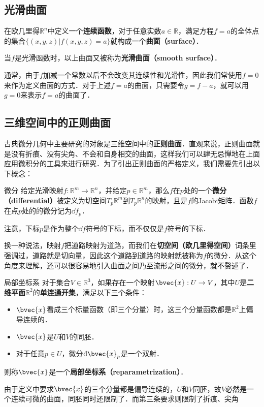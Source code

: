 
\subsection{光滑曲面}

在欧几里得$\mathbb{R}^n$中定义一个\textbf{连续函数}，对于任意实数$a\in\mathbb{R}$，满足方程$f=a$的全体点的集合$\{(x, y, z)|f(x, y, z)=a\}$就构成一个\textbf{曲面（surface）}．

当$f$是光滑函数时，以上曲面又被称为\textbf{光滑曲面（smooth surface）}．

通常，由于$f$加减一个常数以后不会改变其连续性和光滑性，因此我们常使用$f=0$来作为定义曲面的方式．对于上述$f=a$的曲面，只需要令$g=f-a$，就可以用$g=0$来表示$f=a$的曲面了．

\subsection{三维空间中的正则曲面}

古典微分几何中主要研究的对象是三维空间中的\textbf{正则曲面}．直观来说，正则曲面就是没有折痕、没有尖角、不会和自身相交的曲面，这样我们可以肆无忌惮地在上面应用微积分的工具来进行研究．为了引出正则曲面的严格定义，我们需要先引出以下概念：

\begin{definition}{微分}
给定光滑映射$f:\mathbb{R}^m\to\mathbb{R}^n$，并给定$p\in\mathbb{R}^m$，那么$f$在$p$处的一个\textbf{微分（differential）}被定义为切空间$T_p\mathbb{R}^m$到$T_p\mathbb{R}^n$的映射，且是$f$的Jacobi矩阵．函数$f$在点$p$处的的微分记为$\dd f_p$．
\end{definition}

注意，下标$p$是作为整个$\dd f$符号的下标，而不仅仅是$f$符号的下标．

换一种说法，映射$f$把道路映射为道路，而我们在\textbf{切空间（欧几里得空间）}词条里强调过，道路就是切向量，因此这个道路到道路的映射就被称为$f$的微分．从这个角度来理解，还可以很容易地引入曲面之间乃至流形之间的微分，就不赘述了．


\begin{definition}{局部坐标系}
对于集合$V\in \mathbb{R}^3$，如果存在一个映射$\bvec{x}:U\to V$，其中$U$是\textbf{二维平面}$\mathbb{R}^2$的\textbf{单连通开集}，满足以下三个条件：
\begin{itemize}
\item $\bvec{x}$看成三个标量函数（即三个分量）时，这三个分量函数都是$\mathbb{R}^2$上偏导连续的．
\item $\bvec{x}$是$U$和$V$的同胚．
\item 对于任意$p\in U$，微分$\mathrm{d}\bvec{x}_p$是一个双射．
\end{itemize}
则称$\bvec{x}$是一个\textbf{局部坐标系（reparametrization）}．
\end{definition}

由于定义中要求$\bvec{x}$的三个分量都是偏导连续的，$U$和$V$同胚，故$V$必然是一个连续可微的曲面，同胚同时还限制了．而第三条要求则限制了折痕、尖角
